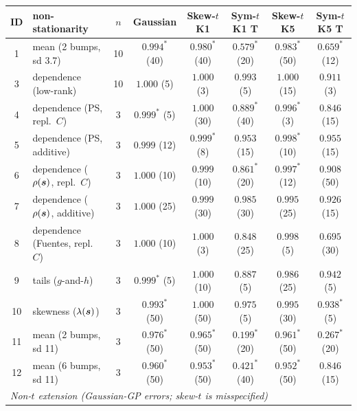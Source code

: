 \setlength{\tabcolsep}{3.7pt}
\begin{tabular}{clcccccc}
\toprule
ID & non-stationarity & $n$ & Gaussian & Skew-$t$ K1 & Sym-$t$ K1 T & Skew-$t$ K5 & Sym-$t$ K5 T \\
\midrule
1 & mean (2 bumps, sd 3.7) & 10 & $0.994^{*}$ {\tiny(40)} & $0.980^{*}$ {\tiny(40)} & $\mathbf{0.579^{*}}$ {\tiny(20)} & $0.983^{*}$ {\tiny(50)} & $\mathbf{0.659^{*}}$ {\tiny(12)} \\
3 & dependence (low-rank) & 10 & $1.000$ {\tiny(5)} & $1.000$ {\tiny(3)} & $0.993$ {\tiny(5)} & $1.000$ {\tiny(15)} & $0.911$ {\tiny(3)} \\
4 & dependence (PS, repl.\ $C$) & 3 & $0.999^{*}$ {\tiny(5)} & $1.000$ {\tiny(30)} & $0.889^{*}$ {\tiny(40)} & $0.996^{*}$ {\tiny(3)} & $0.846$ {\tiny(15)} \\
5 & dependence (PS, additive) & 3 & $0.999$ {\tiny(12)} & $0.999^{*}$ {\tiny(8)} & $0.953$ {\tiny(15)} & $0.998^{*}$ {\tiny(10)} & $0.955$ {\tiny(15)} \\
6 & dependence ($\rho(\boldsymbol{s})$, repl.\ $C$) & 3 & $1.000$ {\tiny(10)} & $0.999$ {\tiny(10)} & $0.861^{*}$ {\tiny(20)} & $0.997^{*}$ {\tiny(12)} & $0.908$ {\tiny(50)} \\
7 & dependence ($\rho(\boldsymbol{s})$, additive) & 3 & $1.000$ {\tiny(25)} & $0.999$ {\tiny(30)} & $0.985$ {\tiny(30)} & $0.995$ {\tiny(25)} & $0.926$ {\tiny(15)} \\
8 & dependence (Fuentes, repl.\ $C$) & 3 & $1.000$ {\tiny(10)} & $1.000$ {\tiny(3)} & $0.848$ {\tiny(25)} & $0.998$ {\tiny(5)} & $\mathbf{0.695}$ {\tiny(30)} \\
9 & tails ($g$-and-$h$) & 3 & $0.999^{*}$ {\tiny(5)} & $1.000$ {\tiny(10)} & $0.887$ {\tiny(5)} & $0.986$ {\tiny(25)} & $0.942$ {\tiny(5)} \\
10 & skewness ($\lambda(\boldsymbol{s})$) & 3 & $0.993^{*}$ {\tiny(50)} & $1.000$ {\tiny(50)} & $0.975$ {\tiny(5)} & $0.995$ {\tiny(30)} & $0.938^{*}$ {\tiny(5)} \\
11 & mean (2 bumps, sd 11) & 3 & $0.976^{*}$ {\tiny(50)} & $0.965^{*}$ {\tiny(50)} & $\mathbf{0.199^{*}}$ {\tiny(20)} & $0.961^{*}$ {\tiny(50)} & $\mathbf{0.267^{*}}$ {\tiny(20)} \\
12 & mean (6 bumps, sd 11) & 3 & $0.960^{*}$ {\tiny(50)} & $0.953^{*}$ {\tiny(50)} & $\mathbf{0.421^{*}}$ {\tiny(40)} & $0.952^{*}$ {\tiny(50)} & $0.846$ {\tiny(15)} \\
\midrule
\multicolumn{8}{l}{\emph{Non-$t$ extension (Gaussian-GP errors; skew-$t$ is misspecified)}} \\

\end{tabular}
